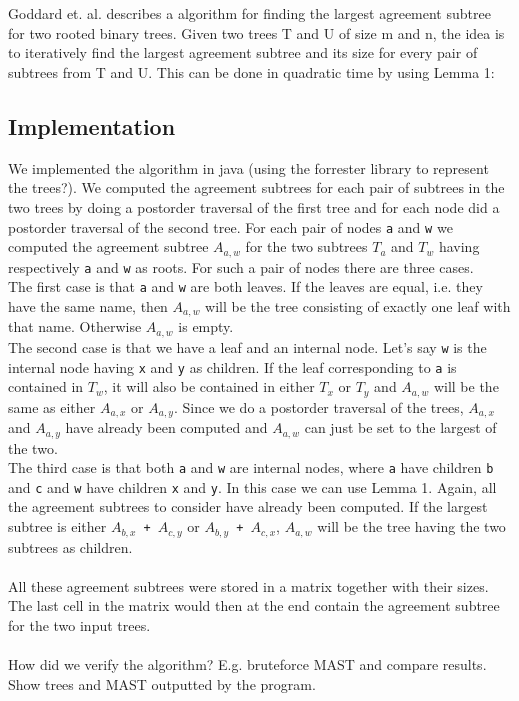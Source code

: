 \chapter{}
Goddard et. al.\cite{nsquared} describes a  algorithm for finding the largest agreement subtree for two rooted binary trees. Given two trees T and U of size m and n, the idea is to iteratively find the largest agreement subtree and its size for every pair of subtrees from T and U. This can be done in quadratic time by using Lemma 1: \todo{\dots}

\section{Implementation}
We implemented the algorithm in java (using the forrester \cite{?} library to represent the trees?). We computed the agreement subtrees for each pair of subtrees in the two trees by doing a postorder traversal of the first tree and for each node did a postorder traversal of the second tree. For each pair of nodes \texttt{a} and \texttt{w} we computed the agreement subtree \texttt{$A_{a,w}$} for the two subtrees \texttt{$T_a$} and \texttt{$T_w$} having respectively \texttt{a} and \texttt{w} as roots. For such a pair of nodes there are three cases. \\
The first case is that \texttt{a} and \texttt{w} are both leaves. If the leaves are equal, i.e. they have the same name, then \texttt{$A_{a,w}$} will be the tree consisting of exactly one leaf with that name. Otherwise \texttt{$A_{a,w}$} is empty. \\
The second case is that we have a leaf and an internal node. Let's say \texttt{w} is the internal node having \texttt{x} and \texttt{y} as children. If the leaf corresponding to \texttt{a} is contained in \texttt{$T_w$}, it will also be contained in either \texttt{$T_x$} or \texttt{$T_y$} and \texttt{$A_{a,w}$} will be the same as either \texttt{$A_{a,x}$} or \texttt{$A_{a,y}$}. Since we do a postorder traversal of the trees, \texttt{$A_{a,x}$} and \texttt{$A_{a,y}$} have already been computed and \texttt{$A_{a,w}$} can just be set to the largest of the two. \\
The third case is that both \texttt{a} and \texttt{w} are internal nodes, where \texttt{a} have children \texttt{b} and \texttt{c} and \texttt{w} have children \texttt{x} and \texttt{y}. In this case we can use Lemma 1. Again, all the agreement subtrees to consider have already been computed. If the largest subtree is either \texttt{$A_{b,x}$ + $A_{c,y}$} or \texttt{$A_{b,y}$ + $A_{c,x}$}, \texttt{$A_{a,w}$} will be the tree having the two subtrees as children. \\
\\
All these agreement subtrees were stored in a matrix together with their sizes. The last cell in the matrix would then at the end contain the agreement subtree for the two input trees.\\
\\
How did we verify the algorithm? E.g. bruteforce MAST and compare results.\\
Show trees and MAST outputted by the program.\\


\todo{\dots}